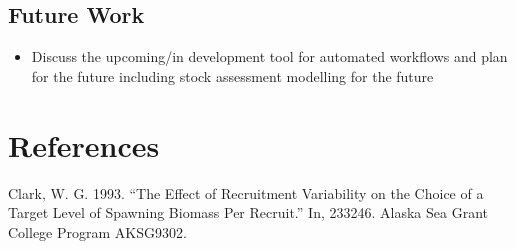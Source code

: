 \documentclass[
  letterpaper,
  oneside,
  open=any]{scrbook}
\providecommand{\tightlist}{%
  \setlength{\itemsep}{0pt}\setlength{\parskip}{0pt}}\usepackage{longtable,booktabs,array}
\newlength{\cslhangindent}
\newenvironment{CSLReferences}[2] %
 {\begin{list}{}{%
  \setlength{\itemindent}{0pt}
  \setlength{\leftmargin}{0pt}
  \setlength{\parsep}{0pt}
  \ifodd #1
   \setlength{\leftmargin}{\cslhangindent}
   \setlength{\itemindent}{-1\cslhangindent}
  \fi
  \setlength{\itemsep}{#2\baselineskip}}}
 {\end{list}}
\begin{document}
\section{Future Work}\label{future-work}

\begin{itemize}
\tightlist
\item
  Discuss the upcoming/in development tool for automated workflows and
  plan for the future including stock assessment modelling for the
  future
\end{itemize}


\chapter*{References}\label{references}


\label{refs}
\begin{CSLReferences}{1}{0}
Clark, W. G. 1993. {``The Effect of Recruitment Variability on the
Choice of a Target Level of Spawning Biomass Per Recruit.''} In, 233246.
Alaska Sea Grant College Program
AK{\textendash}SG{\textendash}93{\textendash}02.

\end{CSLReferences}


\backmatter
\end{document}
